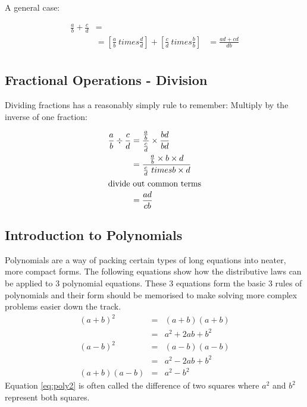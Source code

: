 A general case:

\begin{align}
  \frac{a}{b} + \frac{c}{d} & = \\
    & = [\frac{a}{b} \ times \frac{d}{d}] + [\frac{c}{d} \ times \frac{b}{b} ]
    & = \frac{ad + cd}{db} \\
\end{align}

\newpage
\subsection{Fractional Operations - Division}
\label{sec:FractionalOperationsDivision}
Dividing fractions has a reasonably simply rule to remember: Multiply by the
inverse of one fraction:

\begin{align}
  \frac{a}{b} \div \frac{c}{d} & = \frac{ \frac{a}{b} }{ \frac{c}{d}} \times
  \frac{bd}{bd} \\
   & = \frac{\frac{a}{b}\times b \times d}{\frac{c}{d} \ times b \times d} \\
  \intertext{divide out common terms}
   & = \frac{ad}{cb}
\end{align}

\newpage
\subsection{Introduction to Polynomials}
\label{sec:IntroductionToPolynomials}
Polynomials are a way of packing certain types of long equations into neater,
more compact forms. The following equations show how the distributive laws can
be applied to 3 polynomial equations. These 3 equations form the basic 3 rules
of polynomials and their form should be memorised to make solving more complex
problems easier down the track.
\begin{align}
  {(a+b)}^{2} & = & (a+b)(a+b) \nonumber \\
              & = & {a}^{2} + 2ab + {b}^{2} \label{eq:poly0} \\
  {(a-b)}^{2} & = & (a-b)(a-b) \nonumber \\
              & = & {a}^{2} - 2ab + {b}^{2} \label{eq:poly1} \\
  (a+b)(a-b)  & = & {a}^{2} - {b}^{2} \label{eq:poly2}
\end{align}
Equation \ref{eq:poly2} is often called the difference of two squares where
${a}^{2}$ and ${b}^{2}$ represent both squares.
